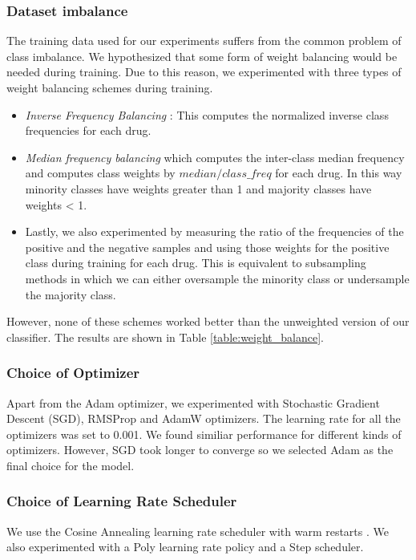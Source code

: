 \documentclass{article}
\begin{document}
\subsubsection{Dataset imbalance}
The training data used for our experiments suffers from the common problem of class imbalance. We hypothesized
that some form of weight balancing would be needed during training. Due to this reason, we experimented with
three types of weight balancing schemes during training.
\begin{itemize}
  \item \emph{Inverse Frequency Balancing} : This computes the normalized inverse class frequencies for each drug.
  \item \emph{Median frequency balancing} which computes the inter-class median 
  frequency and computes class weights by $median / class\_freq$ for each drug. In this way minority classes have weights
  greater than 1 and majority classes have weights < 1.
  \item Lastly, we also experimented by measuring the ratio of
  the frequencies of the positive and the negative samples and using those weights for the positive class during
  training for each drug. This is equivalent to subsampling methods in which we can either oversample the minority
  class or undersample the majority class.
\end{itemize}
  However, none of these schemes worked better than the unweighted version of our classifier.
The results are shown in Table \ref{table:weight_balance}.

\subsubsection{Choice of Optimizer}
Apart from the Adam optimizer, we experimented with Stochastic Gradient Descent (SGD), RMSProp and AdamW \cite{loshchilov2019decoupled} 
optimizers. The learning rate for all the optimizers was set to 0.001. We found
similiar performance for different kinds of optimizers. However, SGD took longer to
converge so we selected Adam as the final choice for the model.

\subsubsection{Choice of Learning Rate Scheduler}
We use the Cosine Annealing learning rate scheduler with warm restarts \cite{loshchilov2017sgdr}.
We also experimented with a Poly learning rate policy and a Step scheduler.
\end{document}
